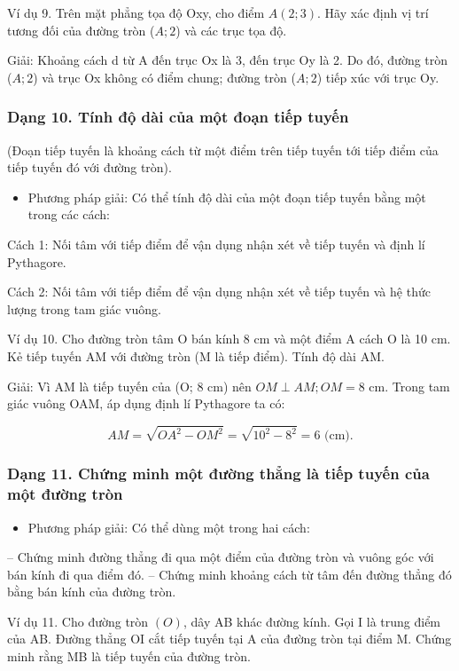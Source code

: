 \documentclass[%
    fontsize=12pt,%
    chapterprefix=false,%
    open=right,%
    twoside=false,%
    numbers=noenddot,%
    headings=optiontohead,%
    final,%
    DIV=15,%
    parskip=half %
]{scrbook}
\begin{document}
Ví dụ 9. Trên mặt phẳng tọa độ Oxy, cho điểm $ A(2;3) $. Hãy xác định vị trí tương đối của đường tròn ($ A;2 $) và các trục tọa độ.

Giải: Khoảng cách d từ A đến trục Ox là 3, đến trục Oy là 2. Do đó, đường tròn ($ A;2 $) và trục Ox không có điểm chung; đường tròn ($ A;2 $) tiếp xúc với trục Oy.

\subsubsection{Dạng 10. Tính độ dài của một đoạn tiếp tuyến}

(Đoạn tiếp tuyến là khoảng cách từ một điểm trên tiếp tuyến tới tiếp điểm của tiếp tuyến đó với đường tròn).

\begin{itemize}
  \item Phương pháp giải: Có thể tính độ dài của một đoạn tiếp tuyến bằng một trong các cách:
\end{itemize}

Cách 1: Nối tâm với tiếp điểm để vận dụng nhận xét về tiếp tuyến và định lí Pythagore.

Cách 2: Nối tâm với tiếp điểm để vận dụng nhận xét về tiếp tuyến và hệ thức lượng trong tam giác vuông.

Ví dụ 10. Cho đường tròn tâm O bán kính 8 cm và một điểm A cách O là 10 cm. Kẻ tiếp tuyến AM với đường tròn (M là tiếp điểm). Tính độ dài AM.

Giải: Vì AM là tiếp tuyến của (O; 8 cm) nên $ OM \perp AM ; OM = 8 $ cm. Trong tam giác vuông OAM, áp dụng định lí Pythagore ta có:

\[
AM = \sqrt{OA^2 - OM^2} = \sqrt{10^2 - 8^2} = 6 \text{ (cm)}.
\]
\subsubsection{Dạng 11. Chứng minh một đường thẳng là tiếp tuyến của một đường tròn}

\begin{itemize}
  \item Phương pháp giải: Có thể dùng một trong hai cách:
\end{itemize}

-- Chứng minh đường thẳng đi qua một điểm của đường tròn và vuông góc với bán kính đi qua điểm đó. -- Chứng minh khoảng cách từ tâm đến đường thẳng đó bằng bán kính của đường tròn.

Ví dụ 11. Cho đường tròn $(O)$, dây AB khác đường kính. Gọi I là trung điểm của AB. Đường thẳng OI cắt tiếp tuyến tại A của đường tròn tại điểm M. Chứng minh rằng MB là tiếp tuyến của đường tròn.
\end{document}
